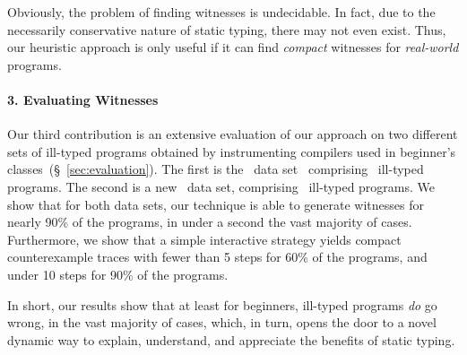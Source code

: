 Obviously, the problem of finding witnesses is undecidable.
In fact, due to the necessarily conservative nature of static
typing, there may not even exist. Thus, our heuristic approach
is only useful if it can find \emph{compact} witnesses for
\emph{real-world} programs.

\paragraph{3. Evaluating Witnesses}
%
Our third contribution is an extensive evaluation of our approach
on two different sets of ill-typed programs obtained by instrumenting
compilers used in beginner's classes~(\S~\ref{sec:evaluation}).
%
The first is the \uwbench\ data set~\cite{lerner_searching_2007}
comprising \uwsize\ ill-typed programs.
%
The second is a new \ucsdbench\ data set, comprising \ucsdsize\
ill-typed programs.
%
We show that for both data sets, our technique is able to generate
witnesses for nearly 90\% of the programs, in under a second the
vast majority of cases.
%
Furthermore, we show that a simple interactive strategy yields
compact counterexample traces with fewer than 5 steps for 60\%
of the programs, and under 10 steps for 90\% of the programs.

\smallskip
In short, our results show that at least for beginners, ill-typed
programs \emph{do} go wrong, in the vast majority of cases, which,
in turn, opens the door to a novel dynamic way to explain, understand,
and appreciate the benefits of static typing.

